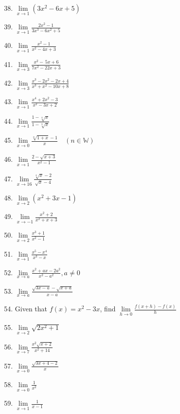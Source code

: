 \documentclass{report}
\begin{document}
\begin{multicols*}{2}
      \begin{enumerate}
            \setcounter{enumi}{37}
            \item $\lim\limits_{x\to1{}}(3x^{2}-6x+5)$
            \item $\lim\limits_{x\to1}{\frac{2x^{2}-1}{3x^{3}-6x^{2}+5}}$
            \item $\lim\limits_{x\to1}{\frac{x^{2}-1}{x^{2}-4x+3}}$
            \item $\lim\limits_{x\to3}{\frac{x^{2}-\,5x+6}{7x^{2}-22x+3}}$
            \item $\lim\limits_{x\to3}{\frac{x^{3}-2x^{2}-2x+4}{x^{3}+x^{2}-10x+8}}$
            \item $\lim\limits_{x\to1}{\frac{x^{4}+2x^{2}-3}{x^{2}-3x+2}}$
            \item $\lim\limits_{x\to1}{\frac{1-{\sqrt[4]{x}}}{1-{\sqrt[3]{x}}}}$
            \item $\lim\limits_{x\to0}{\frac{\sqrt[n]{1+x}-1}{x}} \quad (n \in \mathbb{W})$
            \item $\lim\limits_{x\to1}{\frac{2-{\sqrt{x+3}}}{x^{2}-1}}$
            \item $\lim\limits_{x\to16}{\frac{\sqrt[4]{x}-2}{\sqrt{x}-4}}$
            \item $\lim\limits_{x\to2}(x^{2}+3x-1)$
            \item $\lim\limits_{x\to{-1}}{\frac{x^{2}+2}{x^{2}+x+3}}$
            \item $\lim\limits_{x\to{2}}{\frac{x^{3}+1}{x^{2}-1}}$
            \item $\lim\limits_{x\to1}{\frac{x^{5}-x^{4}}{x^{3}-x}}$
            \item $\lim\limits_{x\to a}{\frac{x^{2}+a x-2a^{2}}{x^{2}-a^{2}}},a\neq0$
            \item $\lim\limits_{x\to a}{\frac{\sqrt{3x-a}-{\sqrt{x+a}}}{x-a}}$
            \item Given that $f(x) = x^2 - 3x$, find $\lim\limits_{h\to0}\frac{f(x+h)-f(x)}{h}$
            \item $\lim\limits_{x\to2}{\sqrt{2x^{2}+1}}$
            \item $\lim\limits_{x\to7}\frac{x^{2}\sqrt{x+2}}{x^{2}+14}$
            \item $\lim\limits_{x\to0}{\frac{{\sqrt{3x+4-2}}}{x}}$
            \item $\lim\limits_{x\to0}{\frac{1}{x^{2}}}$
            \item $\lim\limits_{x\to1}{\frac{1}{x-1}}$

\end{enumerate}
\end{multicols*}
\end{document}
